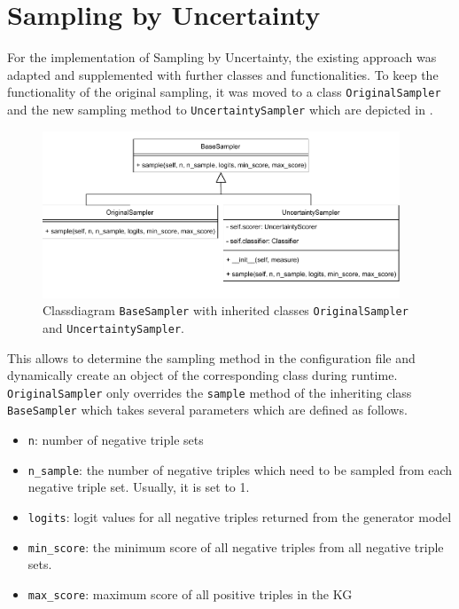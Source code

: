  \section{Sampling by Uncertainty}
 \label{sec:sampling_by_uncertainty}
 
For the implementation of Sampling by Uncertainty, the existing approach was adapted and supplemented with further classes and functionalities.
To keep the functionality of the original sampling, it was moved to a class \texttt{OriginalSampler} and the new sampling method to \texttt{UncertaintySampler} which are depicted in .
\begin{figure}[t]
  \centering
    \includegraphics[width=0.95\textwidth]{figures/classdiagrams/BaseSampler.pdf}
    \caption{Classdiagram \texttt{BaseSampler} with inherited classes \texttt{OriginalSampler} and \texttt{UncertaintySampler}.}
  \label{fig:base_sampler}
\end{figure}
This allows to determine the sampling method in the configuration file and dynamically create an object of the corresponding class during runtime.
\texttt{OriginalSampler} only overrides the \texttt{sample} method of 
the inheriting class \texttt{BaseSampler} which takes several parameters which are defined as follows.
\begin{itemize}
    \item 
    \texttt{n}: number of negative triple sets
    
    \item 
    \texttt{n\_sample}: 
    the number of negative triples which need to be sampled from each negative triple set.
    Usually, it is set to 1.
    
    \item 
    \texttt{logits}:
    logit values for all negative triples returned from the generator model
    
    \item 
    \texttt{min\_score}:
    the minimum score of all negative triples from all negative triple sets.
    
    \item 
    \texttt{max\_score}:
    maximum score of all positive triples in the \ac{KG}
\end{itemize}
